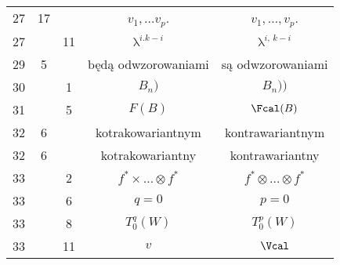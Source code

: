 \documentclass[a4paper,11pt]{article}
\numberwithin{equation}{section}
\renewcommand{\lambda}{\uplambda}
\begin{document}
\begin{center}
\begin{tabular}{|c|c|c|c|c|}
    27  & 17 & & $v_{ 1 }, \ldots v_{ p }$. & $v_{ 1 }, \ldots, v_{ p }$. \\
    27  & & 11 & $\lambda^{ i. k - i }$ & $\lambda^{ i,\, k - i }$ \\
    29  & \hphantom{0}5 & & będą odwzorowaniami & są odwzorowaniami \\
    30  & & \hphantom{0}1 & $B_{ n } )$ & $B_{ n } ) )$ \\
    31  & & \hphantom{0}5 & $F( B )$ & $\Fcal( B )$ \\
    32  & \hphantom{0}6 & & kotrakowariantnym & kontrawariantnym \\
    32  & \hphantom{0}6 & & kotrakowariantny & kontrawariantny \\
    33  & & \hphantom{0}2 & $f^{ * } \times \ldots \otimes f^{ * }$
    & $f^{ * } \otimes \ldots \otimes f^{ * }$ \\
    33  & & \hphantom{0}6 & $q = 0$ & $p = 0$ \\
    33  & & \hphantom{0}8 & $T_{ 0 }^{ q }( W )$ & $T_{ 0 }^{ p }( W )$ \\
    33  & & 11 & $v$ & $\Vcal$ \\
    \hline
  \end{tabular}





  \newpage


\end{center}
\end{document}

